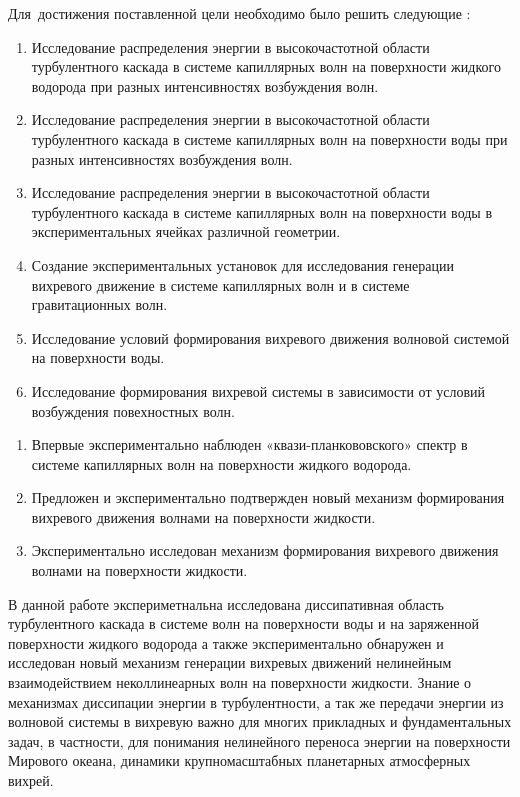 Для~достижения поставленной цели необходимо было решить следующие {\tasks}:
\begin{enumerate}
	\item Исследование распределения энергии в высокочастотной области турбулентного каскада в системе капиллярных волн на поверхности жидкого водорода при разных интенсивностях возбуждения волн.
	\item Исследование распределения энергии в высокочастотной области турбулентного каскада в системе капиллярных волн на поверхности воды при разных интенсивностях возбуждения волн.
	\item Исследование распределения энергии в высокочастотной области турбулентного каскада в системе капиллярных волн на поверхности воды в экспериментальных ячейках различной геометрии.
	\item Создание экспериментальных установок для исследования генерации вихревого движение в системе капиллярных волн и в системе гравитационных волн.
	\item Исследование условий формирования вихревого движения волновой системой на поверхности воды.
	\item Исследование формирования вихревой системы в зависимости от условий возбуждения повехностных волн.
\end{enumerate}

{\novelty}
\begin{enumerate}
	\item Впервые экспериментально наблюден «квази-планкововского» спектр в системе капиллярных волн на поверхности жидкого водорода.
	\item Предложен и экспериментально подтвержден новый механизм формирования вихревого движения волнами на поверхности жидкости.
	\item Экспериментально исследован механизм формирования вихревого движения волнами на поверхности жидкости.
	
\end{enumerate}

{\influence}

В данной работе экспериметнальна исследована диссипативная область турбулентного каскада в системе волн на поверхности воды и на заряженной поверхности жидкого водорода а также экспериментально обнаружен и исследован новый механизм генерации вихревых движений нелинейным взаимодействием неколлинеарных волн на поверхности жидкости. Знание о механизмах диссипации энергии в турбулентности, а так же передачи энергии из волновой системы в вихревую важно для многих прикладных и фундаментальных задач, в частности, для понимания нелинейного переноса энергии на поверхности Мирового океана, динамики крупномасштабных планетарных атмосферных вихрей.



